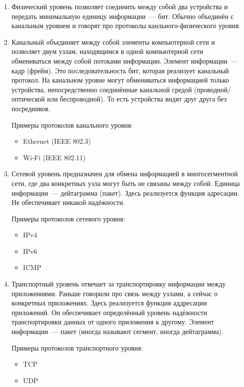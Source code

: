\begin{enumerate}

\item Физический уровень позволяет соединить между собой два устройства и передать минимальную единицу информации~--- бит. Обычно объединён с канальным уровнем и говорят про протоколы канльного-физического уровня.

\item Канальный объединяет между собой элементы компьютерной сети и позволяет двум узлам, находящимся в одной компьютерной сети обмениваться между собой потоками информации. Элемент информации~--- кадр (фрейм). Это последовательность бит, которая реализует канальный протокол. На канальном уровне могут обмениваться информацией только устройства, непосредственно соединённые канальной средой (проводной/оптической или беспроводной). То есть устройства видят друг друга без посредников. 

Примеры протоколов канального уровня: 
\begin{itemize}
    \item Ethernet (IEEE 802.3)
    \item Wi-Fi (IEEE 802.11)
\end{itemize}

\item Сетевой уровень предназначен для обмена информацией в многосегментной сети, где два конкретных узла могут быть не связаны между собой. Единица информации~--- дейтаграмма (пакет). Здесь реализуется функция адресации. Не обеспечивает никакой надёжности.

Примеры протоколов сетевого уровня:
\begin{itemize}
    \item IPv4
    \item IPv6
    \item ICMP
\end{itemize}

\item Транспортный уровень отвечает за транспортировку информации между приложениями. Раньше говорили про связь между узлами, а сейчас о конкретных приложениях. Здесь реализуется функция аддресации приложений. Он обеспечивает определённый уровень надёжности транспортировки данных от одного приложения к другому. Элемент информации~--- пакет (иногда называют сегмент, иногда дейтаграмма).

Примеры протоколов транспортного уровня:
\begin{itemize}
    \item TCP
    \item UDP
\end{itemize}


\end{enumerate}
